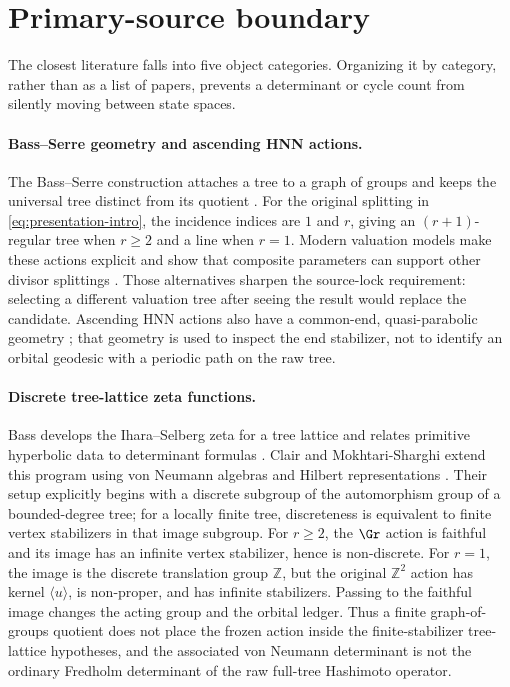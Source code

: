 \section{Primary-source boundary}
\label{sec:literature}

The closest literature falls into five object categories.  Organizing it by
category, rather than as a list of papers, prevents a determinant or cycle
count from silently moving between state spaces.

\paragraph{Bass--Serre geometry and ascending HNN actions.}
The Bass--Serre construction attaches a tree to a graph of groups and keeps
the universal tree distinct from its quotient \citep{serre1980trees}.  For
the original splitting in \eqref{eq:presentation-intro}, the incidence
indices are $1$ and $r$, giving an $(r+1)$-regular tree when $r\ge2$ and a
line when $r=1$.  Modern valuation models make these actions explicit and
show that composite parameters can support other divisor splittings
\citep{abbott2024valuations}.  Those alternatives sharpen the source-lock
requirement: selecting a different valuation tree after seeing the result
would replace the candidate.  Ascending HNN actions also have a common-end,
quasi-parabolic geometry \citep{fima2022transitivity}; that geometry is used
to inspect the end stabilizer, not to identify an orbital geodesic with a
periodic path on the raw tree.

\paragraph{Discrete tree-lattice zeta functions.}
Bass develops the Ihara--Selberg zeta for a tree lattice and relates primitive
hyperbolic data to determinant formulas \citep{bass1992ihara}.
Clair and Mokhtari-Sharghi extend this program using von Neumann algebras and
Hilbert representations \citep{clair2001zeta}.  Their setup explicitly begins
with a discrete subgroup of the automorphism group of a bounded-degree tree;
for a locally finite tree, discreteness is equivalent to finite vertex
stabilizers in that image subgroup.  For $r\ge2$, the $\Gr$ action is faithful
and its image has an infinite vertex stabilizer, hence is non-discrete.  For
$r=1$, the image is the discrete translation group $\mathbb Z$, but the
original $\mathbb Z^2$ action has kernel $\langle u\rangle$, is non-proper,
and has infinite stabilizers.  Passing to the faithful image changes the
acting group and the orbital ledger.  Thus a finite graph-of-groups quotient
does not place the frozen action inside the finite-stabilizer tree-lattice
hypotheses, and the associated von Neumann determinant is not the ordinary
Fredholm determinant of the raw full-tree Hashimoto operator.

